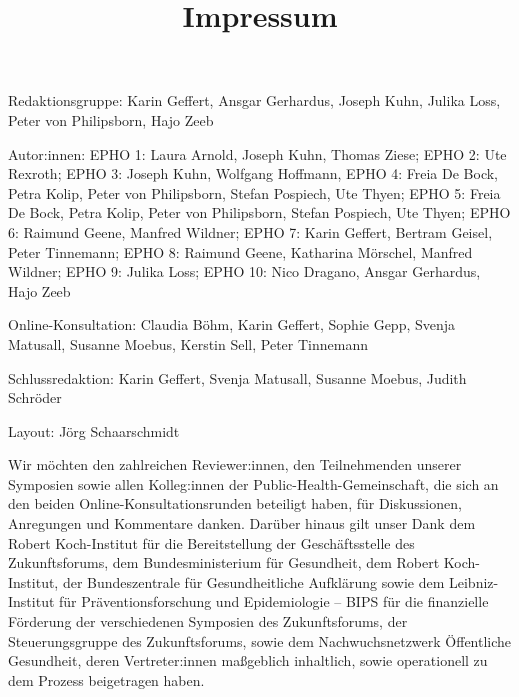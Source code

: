 \documentclass{article}
\begin{document}
\title{Impressum}

\maketitle


Redaktionsgruppe: Karin Geffert, Ansgar Gerhardus, Joseph Kuhn, Julika Loss, Peter von Philipsborn, Hajo Zeeb


Autor:innen: EPHO 1: Laura Arnold, Joseph Kuhn, Thomas Ziese; EPHO 2: Ute Rexroth; EPHO 3: Joseph Kuhn, Wolfgang Hoffmann, EPHO 4: Freia De Bock, Petra Kolip, Peter von Philipsborn, Stefan Pospiech, Ute Thyen; EPHO 5: Freia De Bock, Petra Kolip, Peter von Philipsborn, Stefan Pospiech, Ute Thyen; EPHO 6: Raimund Geene, Manfred Wildner; EPHO 7: Karin Geffert, Bertram Geisel, Peter Tinnemann; EPHO 8: Raimund Geene, Katharina Mörschel, Manfred Wildner; EPHO 9: Julika Loss; EPHO 10: Nico Dragano, Ansgar Gerhardus, Hajo Zeeb


Online-Konsultation: Claudia Böhm, Karin Geffert, Sophie Gepp, Svenja Matusall, Susanne Moebus, Kerstin Sell, Peter Tinnemann


Schlussredaktion: Karin Geffert, Svenja Matusall, Susanne Moebus, Judith Schröder


Layout: Jörg Schaarschmidt


Wir möchten den zahlreichen Reviewer:innen, den Teilnehmenden unserer Symposien sowie allen Kolleg:innen der Public-Health-Gemeinschaft, die sich an den beiden Online-Konsultationsrunden beteiligt haben, für Diskussionen, Anregungen und Kommentare danken. Darüber hinaus gilt unser Dank dem Robert Koch-Institut für die Bereitstellung der Geschäftsstelle des Zukunftsforums, dem Bundesministerium für Gesundheit, dem Robert Koch-Institut, der Bundeszentrale für Gesundheitliche Aufklärung sowie dem Leibniz-Institut für Präventionsforschung und Epidemiologie – BIPS für die finanzielle Förderung der verschiedenen Symposien des Zukunftsforums, der Steuerungsgruppe des Zukunftsforums, sowie dem Nachwuchsnetzwerk Öffentliche Gesundheit, deren Vertreter:innen maßgeblich inhaltlich, sowie operationell zu dem Prozess beigetragen haben.


 
\end{document}
